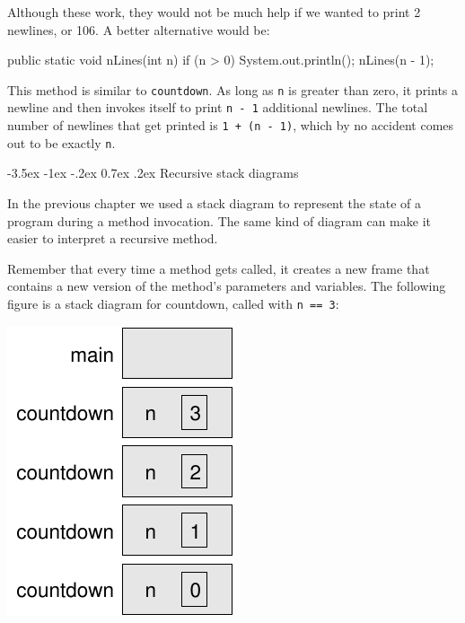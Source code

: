 \documentclass[12pt]{book}
\makeatletter
\renewcommand{\section}{\@startsection {section}{1}{\z@}%
    {-3.5ex \@plus -1ex \@minus -.2ex}%
    {0.7ex \@plus.2ex}%
    {\normalfont\Large\bfseries}}
\theoremstyle{exercise}
\newcommand{\java}[1]{\lstinline{#1}} %
\makeatother
\begin{document}

Although these work, they would not be much help if we wanted to print 2 newlines, or 106.
A better alternative would be:

\begin{code}
    public static void nLines(int n) {
        if (n > 0) {
            System.out.println();
            nLines(n - 1);
        }
    }
\end{code}

This method is similar to \java{countdown}.
As long as \java{n} is greater than zero, it prints a newline and then invokes itself to print \java{n - 1} additional newlines.
The total number of newlines that get printed is \java{1 + (n - 1)}, which by no accident comes out to be exactly \java{n}.


\section{Recursive stack diagrams}


In the previous chapter we used a stack diagram to represent the state of a program during a method invocation.
The same kind of diagram can make it easier to interpret a recursive method.

Remember that every time a method gets called, it creates a new frame that contains a new version of the method's parameters and variables.
The following figure is a stack diagram for countdown, called with \java{n == 3}:

\begin{center}
\includegraphics{figs/stack2.pdf}
\end{center}
\end{document}
